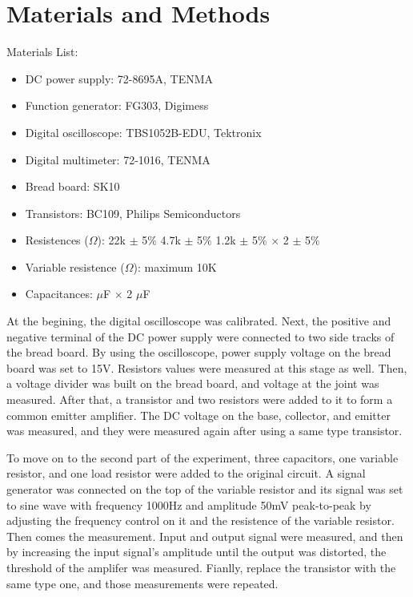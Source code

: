 \documentclass[11pt, a4paper]{article}
\begin{document}
\section{Materials and Methods}

Materials List:
\begin{itemize}
   \item DC power supply: 72-8695A, TENMA
   \item Function generator: FG303, Digimess
   \item Digital oscilloscope: TBS1052B-EDU, Tektronix
   \item Digital multimeter: 72-1016, TENMA
   \item Bread board: SK10
   \item Transistors: BC109, Philips Semiconductors
   \item Resistences ($\Omega$):
     \subitem 22k $\pm$ 5$\%$
     \subitem 4.7k $\pm$ 5$\%$
     \subitem 1.2k $\pm$ 5$\%$ $\times$ 2
      $\pm$ 5$\%$
   \item Variable resistence ($\Omega$): maximum 10K
   \item Capacitances:
     $\mu$F $\times$ 2
     $\mu$F
\end{itemize}

At the begining, the digital oscilloscope was calibrated. Next, the positive and negative terminal of the DC power supply were connected to two side tracks of the bread board. By using the oscilloscope, power supply voltage on the bread board was set to 15V. Resistors values were measured at this stage as well. Then, a voltage divider was built on the bread board, and voltage at the joint was measured. After that, a transistor and two resistors were added to it to form a common emitter amplifier. The DC voltage on the base, collector, and emitter was measured, and they were measured again after using a same type transistor.

To move on to the second part of the experiment, three capacitors, one variable resistor, and one load resistor were added to the original circuit. A signal generator was connected on the top of the variable resistor and its signal was set to sine wave with frequency 1000Hz and amplitude 50mV peak-to-peak by adjusting the frequency control on it and the resistence of the variable resistor. Then comes the measurement. Input and output signal were measured, and then by increasing the input signal's amplitude until the output was distorted, the threshold of the amplifer was measured. Fianlly, replace the transistor with the same type one, and those measurements were repeated.
\end{document}
